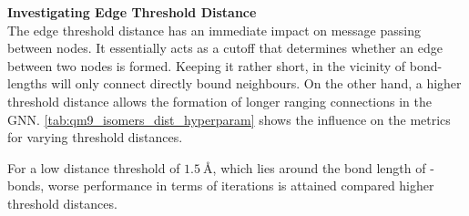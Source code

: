 \textbf{Investigating Edge Threshold Distance}\\
The edge threshold distance has an immediate impact on message passing between nodes. It essentially acts as a cutoff that determines whether an edge between two nodes is formed. Keeping it rather short, in the vicinity of bond-lengths will only connect directly bound neighbours. On the other hand, a higher threshold distance allows the formation of longer ranging connections in the GNN. \autoref{tab:qm9_isomers_dist_hyperparam} shows the influence on the metrics for varying threshold distances.  
\begin{table}[H]
    \centering
    \caption[GNN on QM9 isomers with different edge threshold distances]{GNN performance on QM9  isomers test set for different edge threshold distances (given in $\unit{\angstrom}$). Other hyperparameters are set according to \autoref{tab:init_hparams}.}
    \label{tab:qm9_isomers_dist_hyperparam}
\end{table}
For a low distance threshold of $\SI{1.5}{\angstrom}$, which lies around the bond length of - bonds, worse performance in terms of iterations is attained compared higher threshold distances. 


